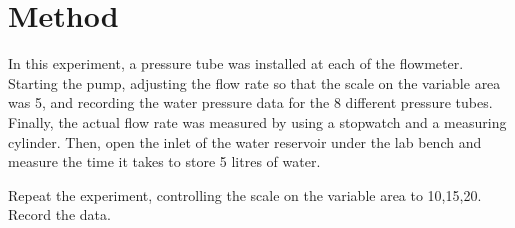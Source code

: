 \section{Method}
In this experiment, a pressure tube was installed at each of the flowmeter.
Starting the pump, adjusting the flow rate so that the scale on the variable area was 5,
and recording the water pressure data for the 8 different pressure tubes.
Finally, the actual flow rate was measured by using a stopwatch and a measuring cylinder.
Then, open the inlet of the water reservoir under the lab bench and measure the time it takes to store 5 litres of water.

Repeat the experiment, controlling the scale on the variable area to 10,15,20. Record the data.













